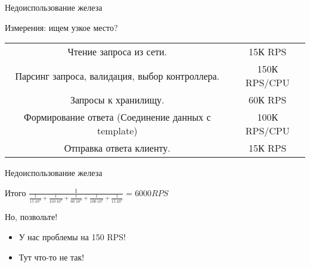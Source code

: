 \documentclass[aspectratio=169]{beamer}
\begin{document}
\begin{frame}{Недоиспользование железа}
    \begin{block}{Измерения: ищем узкое место?}
        \begin{tabular}{ c c }

            \pause Чтение запроса из сети. & 15К RPS  \\
            \pause Парсинг запроса, валидация, выбор контроллера. & 150К RPS/CPU  \\
            \pause Запросы к хранилищу. & 60К RPS \\
            \pause Формирование ответа (Соединение данных с template) & 100К RPS/CPU \\
            \pause Отправка ответа клиенту. & 15К RPS \\

        \end{tabular}
    \end{block}
\end{frame}
    

\begin{frame}{Недоиспользование железа}
    \begin{block}{Итого}
        {\huge
            $\frac{1}{\frac{1}{15 \ 10^3} + \frac{1}{150 \ 10^3} + \frac{1}{60 \ 10^3}+\frac{1}{100 \ 10^3}+\frac{1}{15 \ 10^3}} = 6000 RPS$
        }
    \end{block}

    \pause
    \begin{block}{Но, позвольте!}
        \begin{itemize}
            \pause\item У нас проблемы на 150 RPS!
            \pause\item Тут что-то не так!
        \end{itemize}
    \end{block}
\end{frame}
\end{document}
